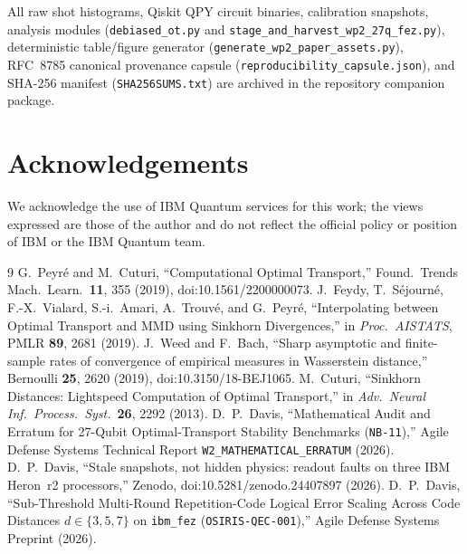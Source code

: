 \documentclass[aps,prapplied,reprint,longbibliography]{revtex4-2}
\begin{document}
All raw shot histograms, Qiskit QPY circuit binaries, calibration snapshots, analysis modules (\texttt{debiased\_ot.py} and \texttt{stage\_and\_harvest\_wp2\_27q\_fez.py}), deterministic table/figure generator (\texttt{generate\_wp2\_paper\_assets.py}), RFC~8785 canonical provenance capsule (\texttt{reproducibility\_capsule.json}), and SHA-256 manifest (\texttt{SHA256SUMS.txt}) are archived in the repository companion package.

\section*{Acknowledgements}
We acknowledge the use of IBM Quantum services for this work; the views expressed are those of the author and do not reflect the official policy or position of IBM or the IBM Quantum team.

\begin{thebibliography}{9}
 G.~Peyr\'{e} and M.~Cuturi, ``Computational Optimal Transport,'' Found.\ Trends Mach.\ Learn.\ \textbf{11}, 355 (2019), doi:10.1561/2200000073.
 J.~Feydy, T.~S\'{e}journ\'{e}, F.-X.~Vialard, S.-i.~Amari, A.~Trouv\'{e}, and G.~Peyr\'{e}, ``Interpolating between Optimal Transport and MMD using Sinkhorn Divergences,'' in \emph{Proc.\ AISTATS}, PMLR \textbf{89}, 2681 (2019).
 J.~Weed and F.~Bach, ``Sharp asymptotic and finite-sample rates of convergence of empirical measures in Wasserstein distance,'' Bernoulli \textbf{25}, 2620 (2019), doi:10.3150/18-BEJ1065.
 M.~Cuturi, ``Sinkhorn Distances: Lightspeed Computation of Optimal Transport,'' in \emph{Adv.\ Neural Inf.\ Process.\ Syst.}\ \textbf{26}, 2292 (2013).
 D.~P.~Davis, ``Mathematical Audit and Erratum for 27-Qubit Optimal-Transport Stability Benchmarks (\texttt{NB-11}),'' Agile Defense Systems Technical Report \texttt{W2\_MATHEMATICAL\_ERRATUM} (2026).
 D.~P.~Davis, ``Stale snapshots, not hidden physics: readout faults on three IBM Heron~r2 processors,'' Zenodo, doi:10.5281/zenodo.24407897 (2026).
 D.~P.~Davis, ``Sub-Threshold Multi-Round Repetition-Code Logical Error Scaling Across Code Distances $d \in \{3,5,7\}$ on \texttt{ibm\_fez} (\texttt{OSIRIS-QEC-001}),'' Agile Defense Systems Preprint (2026).
\end{thebibliography}
\end{document}
